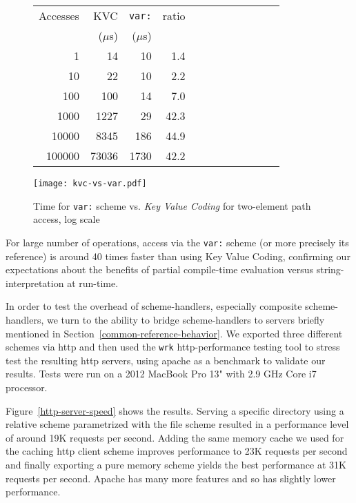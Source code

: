 \documentclass[preprint]{sigplanconf}
\begin{document}
\begin{figure}
\begin{minipage}[c]{0.38\textwidth}
\begin{tabular}{|r|r|r|r|r|r|r|r|r|r|r|r|} \hline
Accesses  & KVC& {\tt var:}   & ratio	\\ 
 & ($\mu$s) & ($\mu$s) & \\ \hline
1 & 14 & 10 & 1.4   \\ %
10 & 22 & 10 &   2.2 \\   %
100 & 100 & 14 &  7.0\\   %
1000 & 1227 & 29 &  42.3  \\  %
10000 & 8345 & 186 &   44.9 \\   %
100000 & 73036 & 1730 &    42.2 \\ \hline
\end{tabular}
\end{minipage}
\begin{minipage}[c]{0.39\textwidth}
\texttt{[image: kvc-vs-var.pdf]}
\end{minipage}
\vspace{-2.0em}
\caption{Time for  {\tt var:} scheme vs. \emph{Key Value Coding} for two-element path access, log scale}
\label{var-speed}
\end{figure}

For large number of operations, access via the {\tt var:} scheme (or more precisely its reference) is
around 40 times faster than using Key Value Coding, confirming our expectations about the benefits
of partial compile-time evaluation versus string-interpretation at run-time.  

In order to test the overhead of scheme-handlers, especially composite scheme-handlers, we turn
to the ability to bridge scheme-handlers to servers briefly mentioned in Section~\ref{common-reference-behavior}.
We exported three different schemes via http and then used the {\tt wrk} http-performance testing tool to stress
test the resulting http servers, using apache as a benchmark to validate our results.  Tests were run on a 2012 MacBook Pro 13" with 2.9 GHz Core i7 processor.

Figure~\ref{http-server-speed} shows the results.  Serving a specific directory using a relative scheme parametrized
with the file scheme resulted in a performance level of around 19K requests per second.  Adding the same memory cache
we used for the caching http client scheme improves performance to 23K requests per second and finally exporting a pure
memory scheme yields the best performance at 31K requests per second.   Apache has many more features and so
has slightly lower performance.
\end{document}
